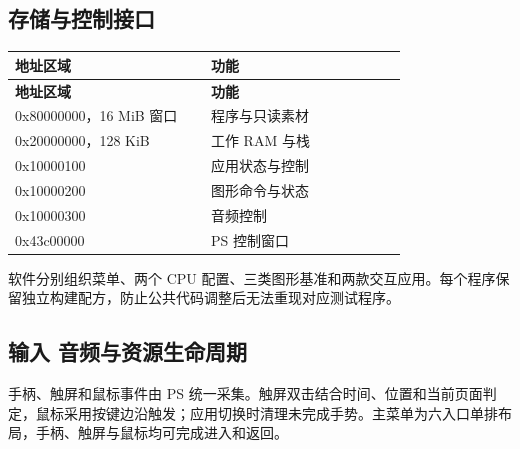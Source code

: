 \documentclass[UTF8,a4paper,12pt]{ctexart}
\begin{document}
\subsection{存储与控制接口}

{\small\setlength{\tabcolsep}{4pt}\renewcommand{\arraystretch}{1.3}

\begin{longtable}{>{\raggedright\arraybackslash}p{0.45\linewidth}>{\raggedright\arraybackslash}p{0.45\linewidth}}

\toprule

\textbf{地址区域} & \textbf{功能} \\ \midrule

\endfirsthead

\toprule

\textbf{地址区域} & \textbf{功能} \\ \midrule

\endhead

0x80000000，16 MiB 窗口 & 程序与只读素材 \\

0x20000000，128 KiB & 工作 RAM 与栈 \\

0x10000100 & 应用状态与控制 \\

0x10000200 & 图形命令与状态 \\

0x10000300 & 音频控制 \\

0x43c00000 & PS 控制窗口 \\

\bottomrule

\end{longtable}

}

软件分别组织菜单、两个 CPU 配置、三类图形基准和两款交互应用。每个程序保留独立构建配方，防止公共代码调整后无法重现对应测试程序。\par

\subsection{输入 音频与资源生命周期}

手柄、触屏和鼠标事件由 PS 统一采集。触屏双击结合时间、位置和当前页面判定，鼠标采用按键边沿触发；应用切换时清理未完成手势。主菜单为六入口单排布局，手柄、触屏与鼠标均可完成进入和返回。\par
\end{document}
